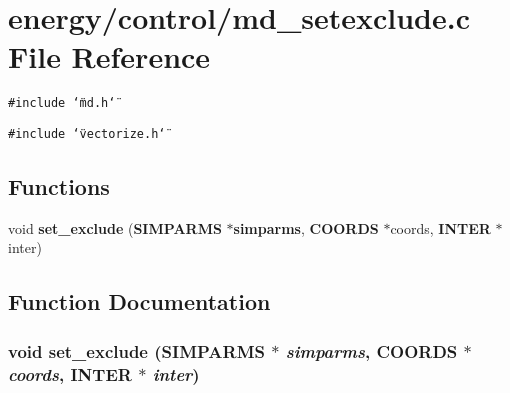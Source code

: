 \section{energy/control/md\_\-setexclude.c File Reference}
\label{md__setexclude_8c}
{\tt \#include \char`\"{}md.h\char`\"{}}\par
{\tt \#include \char`\"{}vectorize.h\char`\"{}}\par
\subsection*{Functions}
\begin{CompactItemize}
\item 
void {\bf set\_\-exclude} ({\bf SIMPARMS} $\ast${\bf simparms}, {\bf COORDS} $\ast$coords, {\bf INTER} $\ast$inter)
\end{CompactItemize}


\subsection{Function Documentation}
\subsubsection{\setlength{\rightskip}{0pt plus 5cm}void set\_\-exclude ({\bf SIMPARMS} $\ast$ {\em simparms}, {\bf COORDS} $\ast$ {\em coords}, {\bf INTER} $\ast$ {\em inter})}\label{md__setexclude_8c_ad3fe15dca2e1091cf3fc5a2c9640e36}


